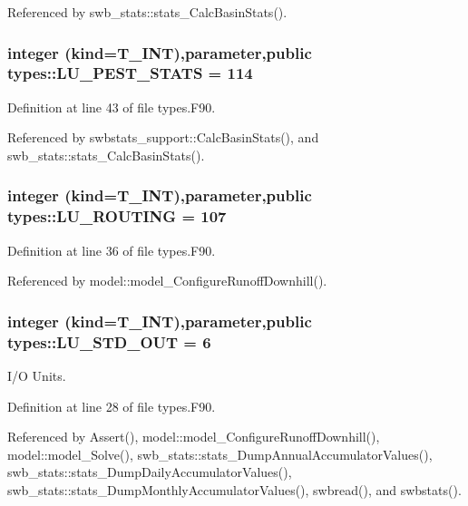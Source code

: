 Referenced by swb\_\-stats::stats\_\-CalcBasinStats().

\hypertarget{namespacetypes_a8ef944fc47b1e170df34b54eba5a9433}{
\subsubsection[{LU\_\-PEST\_\-STATS}]{\setlength{\rightskip}{0pt plus 5cm}integer (kind={\bf T\_\-INT}),parameter,public {\bf types::LU\_\-PEST\_\-STATS} = 114}}
\label{namespacetypes_a8ef944fc47b1e170df34b54eba5a9433}


Definition at line 43 of file types.F90.



Referenced by swbstats\_\-support::CalcBasinStats(), and swb\_\-stats::stats\_\-CalcBasinStats().

\hypertarget{namespacetypes_a94d564eb241f924a1114890a7e8a6901}{
\subsubsection[{LU\_\-ROUTING}]{\setlength{\rightskip}{0pt plus 5cm}integer (kind={\bf T\_\-INT}),parameter,public {\bf types::LU\_\-ROUTING} = 107}}
\label{namespacetypes_a94d564eb241f924a1114890a7e8a6901}


Definition at line 36 of file types.F90.



Referenced by model::model\_\-ConfigureRunoffDownhill().

\hypertarget{namespacetypes_ad3e7016ccd6fed062fbd4bf477b66a81}{
\subsubsection[{LU\_\-STD\_\-OUT}]{\setlength{\rightskip}{0pt plus 5cm}integer (kind={\bf T\_\-INT}),parameter,public {\bf types::LU\_\-STD\_\-OUT} = 6}}
\label{namespacetypes_ad3e7016ccd6fed062fbd4bf477b66a81}


I/O Units. 



Definition at line 28 of file types.F90.



Referenced by Assert(), model::model\_\-ConfigureRunoffDownhill(), model::model\_\-Solve(), swb\_\-stats::stats\_\-DumpAnnualAccumulatorValues(), swb\_\-stats::stats\_\-DumpDailyAccumulatorValues(), swb\_\-stats::stats\_\-DumpMonthlyAccumulatorValues(), swbread(), and swbstats().

